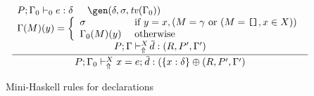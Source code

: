 \begin{figure}
\[\begin{array}{cc}
	\displaystyle\frac
	 {\begin{array}{ll}
           P;\Gamma_0 \vdash_0 e : \delta \: & \: \gen(\delta,\sigma,\tv(\Gamma_0))\\
           \multicolumn{2}{c}{\Gamma(M)(y) = \left\{ \begin{array}{ll}
                                    \sigma & \text{ if } y = x, (M = \gamma \text{ or }
                                                                 (M = \texttt{[]}, x \in X)) \\
                                      \Gamma_0(M)(y) & \text{ otherwise } 
                                   \end{array}\right. }\\[.2cm]                   
           \multicolumn{2}{c}{P;\Gamma \vdash_{\Uparrow}^X \overline{\!d} : (R,P',\Gamma')}
          \end{array}}
	 {P;\Gamma_0 \vdash_{\Uparrow}^X x = e;\: \overline{\!d} : (\{x:\delta\} \oplus (R,P',\Gamma')} 
\end{array} \]
\caption{Mini-Haskell rules for declarations}
\label{fig:mini-haskell-rules-for-declarations}
\end{figure}

